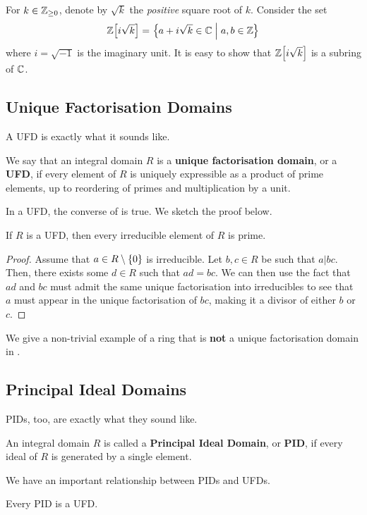 \begin{boxexample}\label{Ch2:Eg:Z[i sqrt(k)]}
    For $k \in \mathbb{Z}_{\geq 0}$, denote by $\sqrt{k}$ the \textit{positive} square root of $k$. Consider the set
    \begin{align}
        \mathbb{Z}\!\left[ i \sqrt{k} \right] = \left\{ a + i\sqrt{k} \in \mathbb{C} \; \middle\vert \; a, b \in \mathbb{Z} \right\}
    \end{align}
    where $i = \sqrt{-1}$ is the imaginary unit. It is easy to show that $\mathbb{Z}\!\left[ i\sqrt{k} \right]$ is a subring of $\mathbb{C}$.
\end{boxexample}

\subsection{Unique Factorisation Domains}

A UFD is exactly what it sounds like.

\begin{boxdefinition}
    We say that an integral domain $R$ is a \textbf{unique factorisation domain}, or a \textbf{UFD}, if every element of $R$ is uniquely expressible as a product of prime elements, up to reordering of primes and multiplication by a unit.
\end{boxdefinition}

In a UFD, the converse of  is true. We sketch the proof below.

\begin{boxlemma}
    If $R$ is a UFD, then every irreducible element of $R$ is prime.
\end{boxlemma}
\begin{proof}
    Assume that $a \in R \setminus \left\{ 0 \right\}$ is irreducible. Let $b, c \in R$ be such that $a \vert bc$. Then, there exists some $d \in R$ such that $ad = bc$. We can then use the fact that $ad$ and $bc$ must admit the same unique factorisation into irreducibles to see that $a$ must appear in the unique factorisation of $bc$, making it a divisor of either $b$ or $c$.
\end{proof}

We give a non-trivial example of a ring that is \textbf{not} a unique factorisation domain in .

\subsection{Principal Ideal Domains}

PIDs, too, are exactly what they sound like.

\begin{boxdefinition}
    An integral domain $R$ is called a \textbf{Principal Ideal Domain}, or \textbf{PID}, if every ideal of $R$ is generated by a single element.
\end{boxdefinition}

We have an important relationship between PIDs and UFDs.

\begin{boxtheorem}
    Every PID is a UFD.
\end{boxtheorem}

